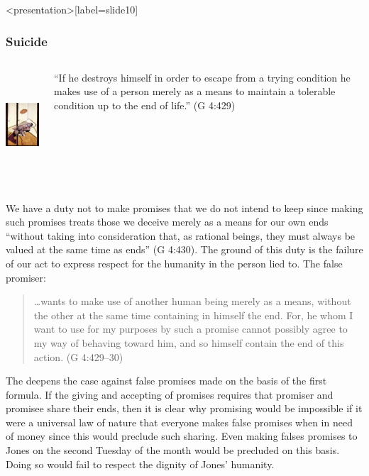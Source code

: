 \begin{frame}<presentation>[label=slide10]
    \frametitle{Suicide}
        \begin{columns}
            \begin{column}{3cm}
                \includegraphics[height=4cm]{../../graphics/suicide.jpg}
            \end{column}
            \begin{column}{7cm}
                ``If he destroys himself in order to escape from a trying condition he makes use of a person merely as a means to maintain a tolerable condition up to the end of life.'' (G 4:429)
            \end{column}
        \end{columns}
\end{frame}

We have a duty not to make promises that we do not intend to keep since making such promises treats those we deceive merely as a means for our own ends ``without taking into consideration that, as rational beings, they must always be valued at the same time as ends'' (G 4:430). The ground of this duty is the failure of our act to express respect for the humanity in the person lied to. The false promiser:
\begin{quote}
	\ldots wants to make use of another human being merely as a means, without the other at the same time containing in himself the end. For, he whom I want to use for my purposes by such a promise cannot possibly agree to my way of behaving toward him, and so himself contain the end of this action. (G 4:429--30)
\end{quote}

The deepens the case against false promises made on the basis of the first formula. If the giving and accepting of promises requires that promiser and promisee share their ends, then it is clear why promising would be impossible if it were a universal law of nature that everyone makes false promises when in need of money since this would preclude such sharing. Even making falses promises to Jones on the second Tuesday of the month would be precluded on this basis. Doing so would fail to respect the dignity of Jones’ humanity. \change

